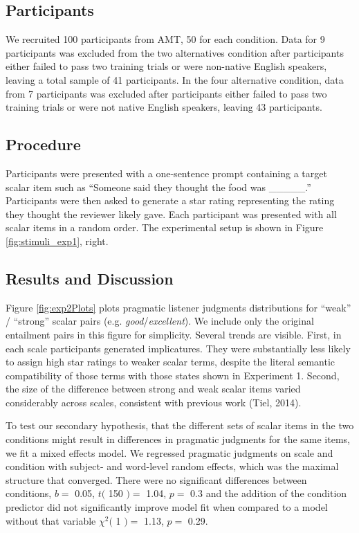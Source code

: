\documentclass[10pt, letterpaper]{article}
\begin{document}
\subsection{Participants}\label{participants-2}

We recruited 100 participants from AMT, 50 for each condition. Data for
9 participants was excluded from the two alternatives condition after
participants either failed to pass two training trials or were
non-native English speakers, leaving a total sample of 41 participants.
In the four alternative condition, data from 7 participants was excluded
after participants either failed to pass two training trials or were not
native English speakers, leaving 43 participants.

\subsection{Procedure}\label{procedure}

Participants were presented with a one-sentence prompt containing a
target scalar item such as ``Someone said they thought the food was
\_\_\_\_\_.'' Participants were then asked to generate a star rating
representing the rating they thought the reviewer likely gave. Each
participant was presented with all scalar items in a random order. The
experimental setup is shown in Figure \ref{fig:stimuli_exp1}, right.

\subsection{Results and Discussion}\label{results-and-discussion-2}

Figure \ref{fig:exp2Plots} plots pragmatic listener judgments
distributions for ``weak'' / ``strong'' scalar pairs (e.g.
\emph{good}/\emph{excellent}). We include only the original entailment
pairs in this figure for simplicity. Several trends are visible. First,
in each scale participants generated implicatures. They were
substantially less likely to assign high star ratings to weaker scalar
terms, despite the literal semantic compatibility of those terms with
those states shown in Experiment 1. Second, the size of the difference
between strong and weak scalar items varied considerably across scales,
consistent with previous work (Tiel, 2014).

To test our secondary hypothesis, that the different sets of scalar
items in the two conditions might result in differences in pragmatic
judgments for the same items, we fit a mixed effects model. We regressed
pragmatic judgments on scale and condition with subject- and word-level
random effects, which was the maximal structure that converged. There
were no significant differences between conditions, \(b =\) 0.05, \(t(\)
150 \() =\) 1.04, \(p =\) 0.3 and the addition of the condition
predictor did not significantly improve model fit when compared to a
model without that variable \(\chi^2(\) 1 \() =\) 1.13, \(p =\) 0.29.
\end{document}
